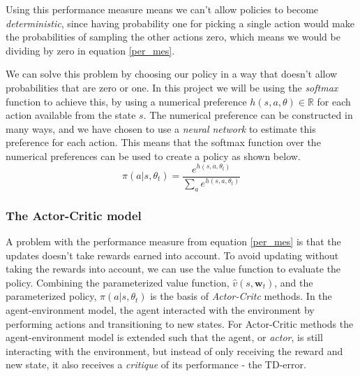 \documentclass[11pt]{article}
\begin{document}
Using this performance measure means we can't allow policies to become \textit{deterministic},
since having probability one for picking a single action would make the probabilities
of sampling the other actions zero, which means we would be dividing by zero
in equation \ref{per_mes}.

We can solve this problem by choosing our policy in a way that doesn't allow probabilities that are zero or one.
In this project we will be using the \textit{softmax} function to achieve this,
by using a numerical preference $h(s, a, \theta) \in \mathbb{R}$
for each action available from the state $s$.
The numerical preference can be constructed in many ways, and we have chosen to use
a \textit{neural network} to estimate this preference for each action.
This means that the softmax function over the numerical preferences can be used to create a policy
as shown below. 
\begin{equation}\label{eq:soft_max}
    \pi(a | s, \theta_t) = \frac{e^{h(s,a,\theta_t)}}{\sum\limits_{a} e^{h(s,a,\theta_t)}}
\end{equation}

\subsubsection{The Actor-Critic model}\label{sec:actor_critic}

A problem with the performance measure from equation \ref{per_mes} is that
the updates doesn't take rewards earned into account. 
To avoid updating without taking the rewards into account, we can
use the value function to evaluate the policy.
Combining the parameterized value function, $\hat{v}(s, \mathbf{w}_t)$,
and the parameterized policy, $\pi(a|s, \theta_t)$ is the basis of \textit{Actor-Critc} methods.
In the agent-environment model, the agent interacted with the environment
by performing actions and transitioning to new states.
For Actor-Critic methods the agent-environment model is extended such that the agent,
or \textit{actor}, is still interacting with the environment, but
instead of only receiving the reward and new state, it also receives
a \textit{critique} of its performance - the TD-error.
\end{document}
